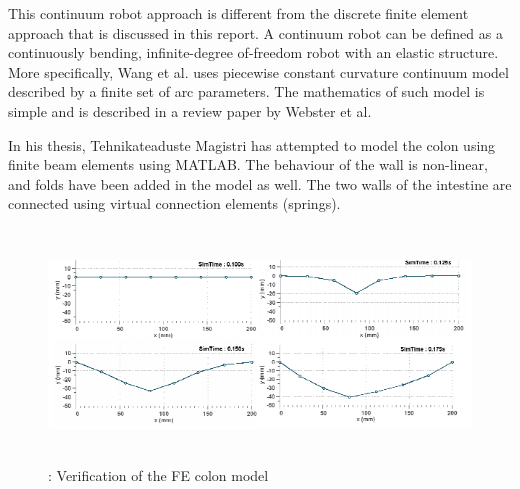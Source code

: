 \documentclass[12pt]{report}
\begin{document}

\par

\par

This continuum robot approach is different from the discrete finite element approach that is discussed in this report. A continuum robot can be defined as a continuously bending, infinite-degree of-freedom robot with an elastic structure. More specifically, Wang et al. uses piecewise constant curvature continuum model described by a finite set of arc parameters. The mathematics of such model is simple and is described in a review paper by Webster et al.\cite{doi:10.1177/0278364910368147}\par

In his thesis, Tehnikateaduste Magistri\cite{Mag12} has attempted to model the colon using finite beam elements using MATLAB. The behaviour of the wall is non-linear, and folds have been added in the model as well. The two walls of the intestine are connected using virtual connection elements (springs).\par


\vspace{\baselineskip}



\begin{figure}[H]
	\begin{Center}
		\includegraphics[width=6.1in,height=2.43in]{./media/image5.png}
		\caption{: Verification of the FE colon model}
		\label{fig:_Verification_of_the_FE_colon_model}
	\end{Center}
\end{figure}


\end{document}
